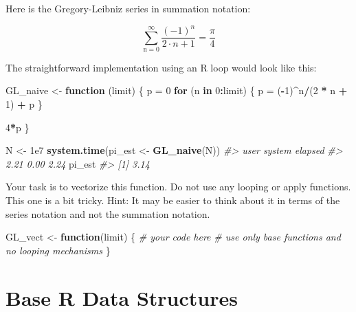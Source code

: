 \documentclass[]{book}
\newenvironment{Shaded}{\begin{snugshade}}{\end{snugshade}}
\newcommand{\KeywordTok}[1]{\textcolor[rgb]{0.13,0.29,0.53}{\textbf{#1}}}
\newcommand{\DecValTok}[1]{\textcolor[rgb]{0.00,0.00,0.81}{#1}}
\newcommand{\FloatTok}[1]{\textcolor[rgb]{0.00,0.00,0.81}{#1}}
\newcommand{\StringTok}[1]{\textcolor[rgb]{0.31,0.60,0.02}{#1}}
\newcommand{\CommentTok}[1]{\textcolor[rgb]{0.56,0.35,0.01}{\textit{#1}}}
\newcommand{\ControlFlowTok}[1]{\textcolor[rgb]{0.13,0.29,0.53}{\textbf{#1}}}
\newcommand{\OperatorTok}[1]{\textcolor[rgb]{0.81,0.36,0.00}{\textbf{#1}}}
\newcommand{\NormalTok}[1]{#1}
\theoremstyle{definition}
\theoremstyle{definition}
\theoremstyle{definition}
\theoremstyle{remark}
\begin{document}
Here is the Gregory-Leibniz series in summation notation:

\begin{equation}
\sum_{\text{n}=0}^{\infty} \frac{(-1)^n}{2\cdot n + 1} = \frac{\pi}{4}
\end{equation}

The straightforward implementation using an R loop would look like this:

\begin{Shaded}
\begin{Highlighting}[]
\NormalTok{GL_naive <-}\StringTok{ }\ControlFlowTok{function}\NormalTok{ (limit) \{}
\NormalTok{  p =}\StringTok{ }\DecValTok{0}
  \ControlFlowTok{for}\NormalTok{ (n }\ControlFlowTok{in} \DecValTok{0}\OperatorTok{:}\NormalTok{limit) \{}
\NormalTok{    p =}\StringTok{ }\NormalTok{(}\OperatorTok{-}\DecValTok{1}\NormalTok{)}\OperatorTok{^}\NormalTok{n}\OperatorTok{/}\NormalTok{(}\DecValTok{2} \OperatorTok{*}\StringTok{ }\NormalTok{n }\OperatorTok{+}\StringTok{ }\DecValTok{1}\NormalTok{) }\OperatorTok{+}\StringTok{ }\NormalTok{p}
\NormalTok{    \}}

  \DecValTok{4}\OperatorTok{*}\NormalTok{p}
\NormalTok{\}}

\NormalTok{N <-}\StringTok{ }\FloatTok{1e7}
\KeywordTok{system.time}\NormalTok{(pi_est <-}\StringTok{ }\KeywordTok{GL_naive}\NormalTok{(N))}
\CommentTok{#>    user  system elapsed }
\CommentTok{#>    2.21    0.00    2.24}
\NormalTok{pi_est}
\CommentTok{#> [1] 3.14}
\end{Highlighting}
\end{Shaded}

Your task is to vectorize this function. Do not use any looping or apply
functions. This one is a bit tricky. Hint: It may be easier to think
about it in terms of the series notation and not the summation notation.

\begin{Shaded}
\begin{Highlighting}[]
\NormalTok{GL_vect <-}\StringTok{ }\ControlFlowTok{function}\NormalTok{(limit) \{}
  \CommentTok{# your code here}
  \CommentTok{# use only base functions and no looping mechanisms}
\NormalTok{\}}
\end{Highlighting}
\end{Shaded}

\chapter{Base R Data Structures}\label{base-r-data-structures}
\end{document}
